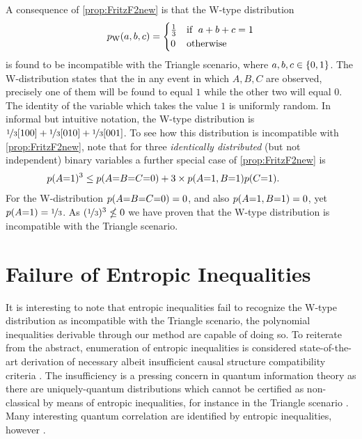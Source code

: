 A consequence of \cref{prop:FritzF2new} is that the W-type distribution
\begin{align}\label{eq:wdistributionnew}
p_{\text{W}}\lparen a,b,c\rparen=\begin{cases}\tfrac{1}{3}&\text{if }\; a+b+c=1 \\ 0&\text{otherwise}\end{cases}
\end{align}
is found to be incompatible with the Triangle scenario, where $a,b,c\in\left\lbrace0,1\right\rbrace$. The W-distribution states that the in any event in which $A,B,C$ are observed, precisely one of them will be found to equal $1$ while the other two will equal $0$. The identity of the variable which takes the value $1$ is uniformly random. In informal but intuitive notation, the W-type distribution is ${\nicefrac{1}{3}[100]+\nicefrac{1}{3}[010]+\nicefrac{1}{3}[001]}$.
To see how this distribution is incompatible with \cref{prop:FritzF2new}, note that for three \emph{identically distributed} (but not independent) binary variables a further special case of \cref{prop:FritzF2new} is
\begin{align*}\begin{split}
&\hspace{-6ex}\p{A\cramp{=}1}^3\leq \p{A\cramp{=}B\cramp{=}C\cramp{=}0} + 3\times\p{A\cramp{=}1,B\cramp{=}1}\p{C\cramp{=}1}.
\end{split}\end{align*}
For the W-distribution ${p\lparen A\mathord{=}B\mathord{=}C\mathord{=}0\rparen=0}$, and also ${p\lparen A\mathord{=}1,B\mathord{=}1\rparen=0}$, yet ${p\lparen A\mathord{=}1\rparen=\nicefrac{1}{3}}$. As ${(\nicefrac{1}{3})^3\nleq 0}$ we have proven that the W-type distribution is incompatible with the Triangle scenario.



\section{Failure of Entropic Inequalities}

It is interesting to note that entropic inequalities \cite{fritz2013marginal,chaves2014novel,chaves2014informationinference} fail to recognize the W-type distribution as incompatible with the Triangle scenario, the polynomial inequalities derivable through our method are capable of doing so. To reiterate from the abstract, enumeration of entropic inequalities is considered state-of-the-art derivation of necessary albeit insufficient causal structure compatibility criteria \cite{pusey2014gdag}. The insufficiency is a pressing concern in quantum information theory as there are uniquely-quantum distributions which cannot be certified as non-classical by means of entropic inequalities, for instance in the Triangle scenario \citep[Prob. 2.17]{fritz2012bell}. Many interesting quantum correlation are identified by entropic inequalities, however \cite{SchumacherInequality,chaves2012entropic}. 

